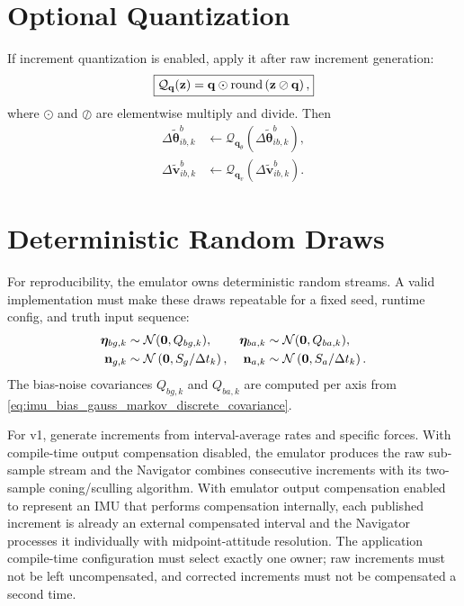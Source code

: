 \section{Optional Quantization}

If increment quantization is enabled, apply it after raw increment generation:
\begin{equation}
\boxed{
\mathcal{Q}_{\mathbf{q}}(\mathbf{z})
=
\mathbf{q}\odot
\operatorname{round}\left(
\mathbf{z}\oslash\mathbf{q}
\right),
}
\label{eq:imu_increment_quantization}
\end{equation}
where $\odot$ and $\oslash$ are elementwise multiply and divide. Then
\begin{align}
\Delta\tilde{\boldsymbol{\theta}}_{ib,k}^{b}
&\leftarrow
\mathcal{Q}_{\mathbf{q}_{\theta}}
\left(
\Delta\tilde{\boldsymbol{\theta}}_{ib,k}^{b}
\right),\\
\Delta\tilde{\mathbf{v}}_{ib,k}^{b}
&\leftarrow
\mathcal{Q}_{\mathbf{q}_{v}}
\left(
\Delta\tilde{\mathbf{v}}_{ib,k}^{b}
\right).
\end{align}

\section{Deterministic Random Draws}

For reproducibility, the emulator owns deterministic random streams. A valid
implementation must make these draws repeatable for a fixed seed, runtime
config, and truth input sequence:
\begin{align}
\boldsymbol{\eta}_{bg,k} &\sim \mathcal{N}(\mathbf{0},Q_{bg,k}),&
\boldsymbol{\eta}_{ba,k} &\sim \mathcal{N}(\mathbf{0},Q_{ba,k}),\\
\mathbf{n}_{g,k} &\sim \mathcal{N}\left(\mathbf{0},S_g/\Delta t_k\right),&
\mathbf{n}_{a,k} &\sim \mathcal{N}\left(\mathbf{0},S_a/\Delta t_k\right).
\end{align}
The bias-noise covariances $Q_{bg,k}$ and $Q_{ba,k}$ are computed per axis
from \cref{eq:imu_bias_gauss_markov_discrete_covariance}.

\begin{implbox}
For v1, generate increments from interval-average rates and specific forces.
With compile-time output compensation disabled, the emulator produces the raw
sub-sample stream and the Navigator combines consecutive increments with its
two-sample coning/sculling algorithm. With emulator output compensation
enabled to represent an IMU that performs compensation internally, each
published increment is already an external compensated interval and the
Navigator processes it individually with midpoint-attitude resolution. The
application compile-time configuration must select exactly one owner; raw
increments must not be left uncompensated, and corrected increments must not
be compensated a second time.
\end{implbox}

